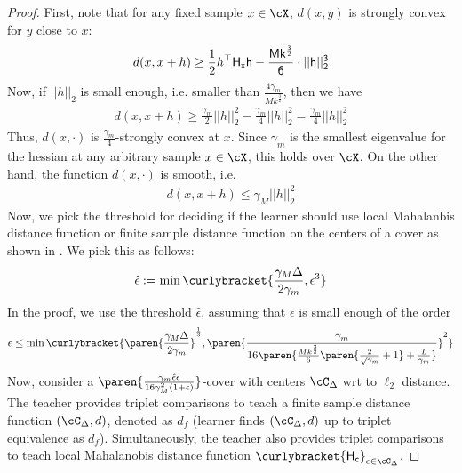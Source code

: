 \begin{proof}
    
    First, note that for any fixed sample $x \in \cX$, $d(x, y)$ is strongly convex for $y$ close to $x$:
    \begin{align*}
        d(x, x+ h) \ge \frac{1}{2}h^{\top}\sf{H}_x h - \frac{M k^{\frac{3}{2}}}{6} \cdot||h||^{3}_2
    \end{align*}
    Now, if $||h||_2$ is small enough, i.e. smaller than $\frac{4\gamma_m}{M k^{\frac{3}{2}}}$, then we have 
    \begin{align}
        d(x, x+ h) \ge \frac{\gamma_m}{2}||h||^2_2 - \frac{\gamma_m}{4}||h||^2_2 = \frac{\gamma_m}{4}||h||^2_2 \label{eq: strongconvex}
    \end{align}
    Thus, $d(x,\cdot)$ is $\frac{\gamma_m}{4}$-strongly convex at $x$. Since $\gamma_m$ is the smallest eigenvalue for the hessian at any arbitrary sample $x \in \cX$, this holds over $\cX$. On the other hand, the function $d(x,\cdot)$ is smooth, i.e.
    \begin{align}
        d(x, x+ h) \le \gamma_M ||h||^2_2 \label{eq: smoothconvex}
    \end{align}
    Now, we pick the threshold for deciding if the learner should use local Mahalanbis distance function or finite sample distance function on the centers of a cover as shown in . We pick this as follows:
    \begin{align*}
        \hat{\epsilon} := \min\curlybracket{\frac{\gamma_M\Delta}{2\gamma_m}, \epsilon^3}%
    \end{align*}
    In the proof, we use the threshold $\hat{\epsilon}$, assuming that $\epsilon$ is small enough of the order
    \begin{align*}
        \epsilon \le \min\curlybracket{\paren{\frac{\gamma_M \Delta}{2 \gamma_m}}^{\frac{1}{3}}, \paren{\frac{\gamma_m}{16\paren{\frac{M k^{\frac{3}{2}}}{6}\paren{\frac{2}{\sqrt{\gamma_m}} + 1} + \frac{L}{\gamma_m}}}}^2}
    \end{align*}
    Now, consider a $\paren{\frac{\gamma_m \hat{\epsilon}\epsilon}{16\gamma_M^2 (1 + \epsilon)}}$-cover with centers $\cC_\Delta$ wrt to $\ell_2$ distance. The teacher provides triplet comparisons to teach a finite sample distance function $(\cC_\Delta,d)$, denoted as $d_f$ (learner finds  $(\cC_\Delta,d)$ up to triplet equivalence as $d_f$). Simultaneously, the teacher also provides triplet comparisons to teach local Mahalanobis distance function $\curlybracket{\sf{H}_c}_{c \in \cC_\Delta}$.


\end{proof}
